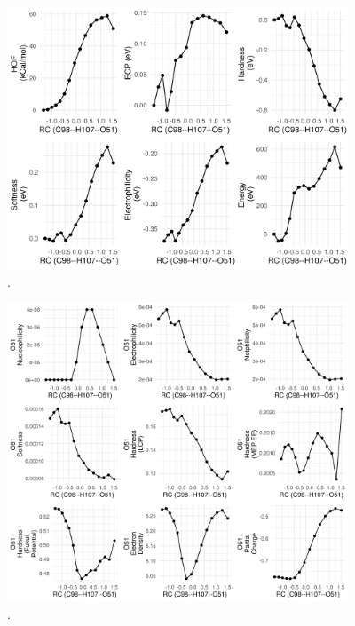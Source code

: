 \documentclass[a4paper,11pt]{refart}
\begin{document}
\hspace*{-\leftmarginwidth}
\begin{minipage}{\fullwidth}
	\begin{figure}[H]
		\begin{center}
			\includegraphics[width=4in]{images/tut6_img2}
			\caption{.}
			\label{fig_tut6_1}
		\end{center}
	\end{figure}
\end{minipage}


\hspace*{-\leftmarginwidth}
\begin{minipage}{\fullwidth}
	\begin{figure}[H]
		\begin{center}
			\includegraphics[width=4in]{images/tut6_img3}
			\caption{.}
			\label{fig_tut6_2}
		\end{center}
	\end{figure}
\end{minipage}
\end{document}
